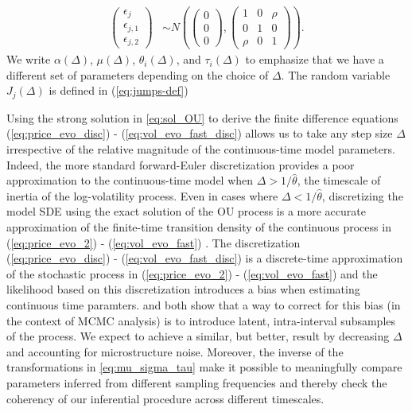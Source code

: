 \documentclass[10pt]{article}
\begin{document}
\begin{align*}
  \left( \begin{matrix} \epsilon_{j} \\
      \epsilon_{j,1} \\ \epsilon_{j,2} \end{matrix} \right) &\sim
                                            N \left( \left(\begin{matrix} 0 \\ 0 \\
	                                          0 \end{matrix}
                                              \right) ,
  \left( \begin{matrix} 1 & 0 & \rho \\
      0 & 1 & 0 \\
    \rho & 0 & 1 \end{matrix} \right) \right) .
\end{align*}
We write $\alpha(\Delta)$, $\mu(\Delta)$, $\theta_i(\Delta)$, and $\tau_i(\Delta)$ to emphasize that we have a different set of parameters depending on the choice of $\Delta$. The random variable $J_j(\Delta)$ is defined in (\ref{eq:jumps-def})

Using the strong solution in \eqref{eq:sol_OU} to derive the finite difference equations (\ref{eq:price_evo_disc}) - (\ref{eq:vol_evo_fast_disc}) allows us to take any step size $\Delta$ irrespective of the relative magnitude of the continuous-time model parameters. Indeed, the more standard forward-Euler discretization provides a poor approximation to the continuous-time model when $\Delta > 1/\hat{\theta}$, the timescale of inertia of the log-volatility process. Even in cases where $\Delta < 1/\hat{\theta}$, discretizing the model SDE  using the exact solution of the OU process is a more accurate approximation of the finite-time transition density of the continuous process in (\ref{eq:price_evo_2}) - (\ref{eq:vol_evo_fast}) \citep{elerian2001likelihood}. The discretization (\ref{eq:price_evo_disc}) - (\ref{eq:vol_evo_fast_disc}) is a discrete-time approximation of the stochastic process in (\ref{eq:price_evo_2}) - (\ref{eq:vol_evo_fast}) and the likelihood based on this discretization introduces a bias when estimating continuous time paramters. \cite{elerian2001likelihood} and \cite{eraker2001mcmc} both show that a way to correct for this bias (in the context of MCMC analysis) is to introduce latent, intra-interval subsamples of the process. We expect to achieve a similar, but better, result by decreasing $\Delta$ and accounting for microstructure noise. Moreover, the inverse of the transformations in \eqref{eq:mu_sigma_tau} make it possible to meaningfully compare parameters inferred from different sampling frequencies and thereby check the coherency of our inferential procedure across different timescales.
\end{document}
